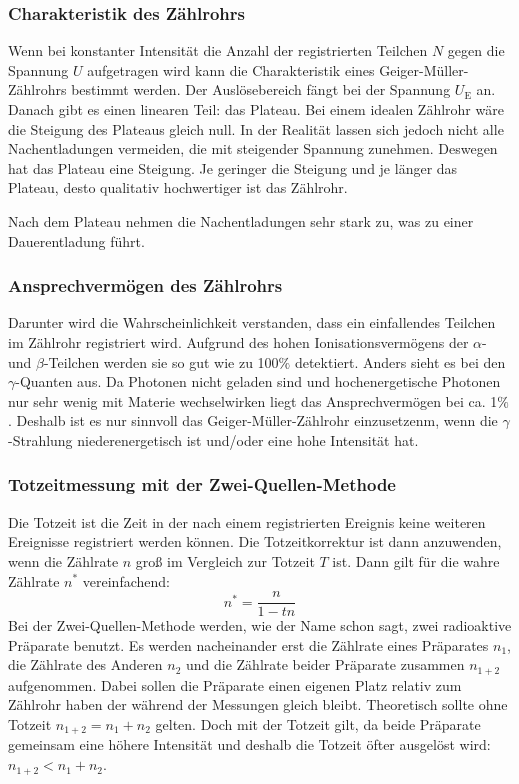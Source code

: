 \documentclass[titlepage = firstcover]{scrartcl}
\begin{document}
        \subsubsection{Charakteristik des Zählrohrs}
          Wenn bei konstanter Intensität die Anzahl der registrierten Teilchen $N$ gegen die Spannung $U$ aufgetragen wird kann die Charakteristik eines Geiger-Müller-Zählrohrs bestimmt werden. Der Auslösebereich fängt bei der Spannung $U_{\text{E}}$ an. Danach gibt es einen linearen Teil: das Plateau. Bei einem idealen Zählrohr wäre die Steigung des Plateaus gleich null. In der Realität lassen sich jedoch nicht alle Nachentladungen vermeiden, die mit steigender Spannung zunehmen. Deswegen hat das Plateau eine Steigung. Je geringer die Steigung und je länger das Plateau, desto qualitativ hochwertiger ist das Zählrohr.

          Nach dem Plateau nehmen die Nachentladungen sehr stark zu, was zu einer Dauerentladung führt.

        \subsubsection{Ansprechvermögen des Zählrohrs}
          Darunter wird die Wahrscheinlichkeit verstanden, dass ein einfallendes Teilchen im Zählrohr registriert wird. Aufgrund des hohen Ionisationsvermögens der $\alpha$- und $\beta$-Teilchen werden sie so gut wie zu 100$\%$ detektiert. Anders sieht es bei den $\gamma$-Quanten aus. Da Photonen nicht geladen sind und hochenergetische Photonen nur sehr wenig mit Materie wechselwirken liegt das Ansprechvermögen bei ca. 1$\%$. Deshalb ist es nur sinnvoll das Geiger-Müller-Zählrohr einzusetzenm, wenn die $\gamma$-Strahlung niederenergetisch ist und/oder eine hohe Intensität hat.

        \subsubsection{Totzeitmessung mit der Zwei-Quellen-Methode}
          Die Totzeit ist die Zeit in der nach einem registrierten Ereignis keine weiteren Ereignisse registriert werden können. Die Totzeitkorrektur ist dann anzuwenden, wenn die Zählrate $n$ groß im Vergleich zur Totzeit $T$ ist. Dann gilt für die wahre Zählrate $n^*$ vereinfachend:
          \begin{equation}
            n^* = \frac{n}{1 - t n}
            \label{eqn:totzeit}
          \end{equation}
          Bei der Zwei-Quellen-Methode werden, wie der Name schon sagt, zwei radioaktive Präparate benutzt. Es werden nacheinander erst die Zählrate eines Präparates $n_1$, die Zählrate des Anderen $n_2$ und die Zählrate beider Präparate zusammen $n_{1+2}$ aufgenommen. Dabei sollen die Präparate einen eigenen Platz relativ zum Zählrohr haben der während der Messungen gleich bleibt. Theoretisch sollte ohne Totzeit $n_{1+2} = n_1 + n_2$ gelten. Doch mit der Totzeit gilt, da beide Präparate gemeinsam eine höhere Intensität und deshalb die Totzeit öfter ausgelöst wird:  $n_{1+2} < n_1 + n_2$.
\end{document}
